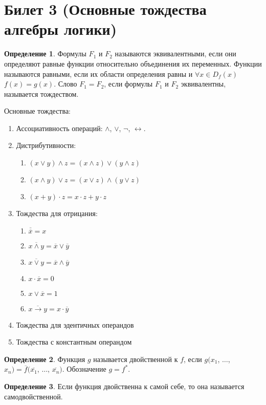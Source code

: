 \documentclass[a4paper, 12pt]{article}
\theoremstyle{definition}
\newtheorem*{definition}{Определение}
\theoremstyle{plain}
\theoremstyle{remark}
\begin{document}
  \section{Билет 3 (Основные тождества алгебры логики)}
  \begin{definition}
    Формулы $F_1$ и $F_2$ называются эквивалентными, если они определяют равные функции относительно объединения их переменных. Функции называются равными, если их области определения равны и $\forall x\in D_f(x)$ $f(x)=g(x)$. Слово $F_1=F_2$, если формулы $F_1$ и $F_2$ эквивалентны, называется тождеством. 
  \end{definition}
  Основные тождества:
  \begin{enumerate}
    \item Ассоциативность операций: $\wedge$, $\vee$, $\neg$, $\leftrightarrow$.
    \item Дистрибутивности:
    \begin{enumerate}
      \item $(x\vee y)\wedge z=(x\wedge z)\vee(y\wedge z)$
      \item $(x\wedge y)\vee z=(x\vee z)\wedge(y\vee z)$
      \item $(x+y)\cdot z=x\cdot z+y\cdot z$
    \end{enumerate}
    \item Тождества для отрицания: 
    \begin{enumerate}
      \item $\overline{\overline{x}}=x$
      \item $\overline{x\wedge y}=\overline{x}\vee \overline{y}$
      \item $\overline{x\vee y}=\overline{x}\wedge \overline{y}$
      \item $x\cdot\overline{x}=0$
      \item $x\vee\overline{x}=1$
      \item $\overline{x\rightarrow y}=x\cdot\overline{y}$
    \end{enumerate}
    \item Тождества для эдентичных операндов
    \item Тождества с константным операндом
  \end{enumerate}
  \begin{definition}
    Функция $g$ называется двойственной к $f$, если $g(x_1$, $\ldots$, $x_n)=\overline{f}(\overline{x_1}$, $\ldots$, $\overline{x_n})$. Обозначение $g=f^*$.
  \end{definition}
  \begin{definition}
    Если функция двойственна к самой себе, то она называется самодвойственной.
  \end{definition}
\end{document}
